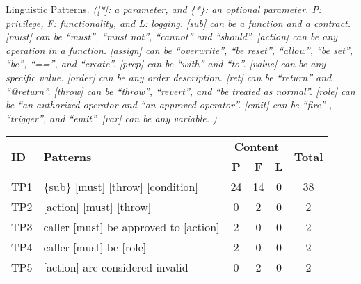 
\begin{table}[t]
    \centering
    \small
    \setlength{\tabcolsep}{3pt} 
    {Linguistic Patterns.}
    {\textit{([*]: a parameter, and \{*\}: an optional parameter.
    P: privilege, F: functionality, and L: logging. 
    [sub] can be a function and a contract.
    [must] can be ``must'', ``must not'', ``cannot'' and ``should''.
    [action] can be any operation in a function.
    [assign] can be ``overwrite'', ``be reset'', ``allow'', ``be set'', ``be'', ``=='', and ``create''. 
    [prep] can be ``with'' and ``to''.
    [value] can be any specific value.
    [order] can be any order description.
    [ret] can be ``return'' and ``@return''.
    [throw] can be ``throw'', ``revert'', and ``be treated as normal''.
    [role] can be ``an authorized operator and ``an approved operator''. 
    [emit] can be ``fire'' , ``trigger'', and ``emit''.
    [var] can be any variable.
    )}
    }
    \begin{tabular}{|l|p{}|c|c|c|c|}
    \hline
\multirow{2}{*}{{\textbf{ID}}} & \multirow{2}{*}{\textbf{Patterns}} & \multicolumn{3}{c|}{\textbf{Content}} & \multirow{2}{*}{{\textbf{Total}}}       \\ \cline{3-5}
 &  & {{\textbf{P}}} & {{\textbf{F}}} &  {{\textbf{L}}} &  \\ \hline \hline
    
    TP1 & \{sub\} [must] [throw] [condition]             & 24  & 14   & 0  & 38        \\ \hline
    TP2 & [action] [must] [throw]                    & 0   & 2  &  0 & 2         \\ \hline
    TP3 & caller [must] be approved to [action]               & 2   &0    &  0   &  2       \\ \hline
    TP4 & caller [must] be [role]                             &  2  & 0 &   0  &   2      \\ \hline
    TP5 & [action] are considered invalid                    &  0  & 2 &   0  &   2      \\ \hline


\end{tabular}
\end{table}
